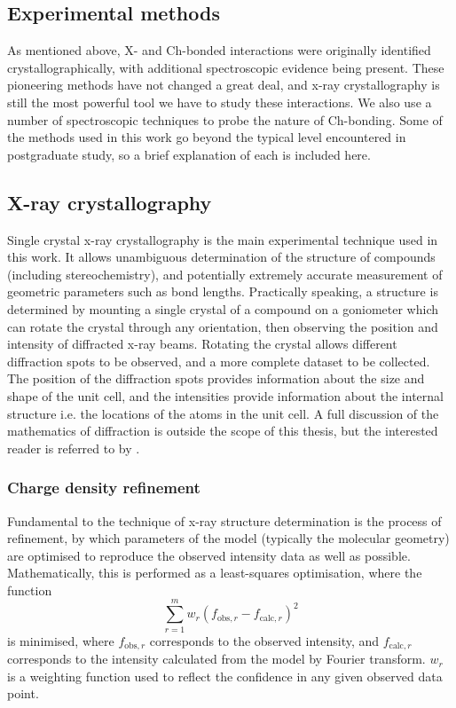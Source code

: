 \begin{refsection}
\section{Experimental methods}
As mentioned above, X- and Ch-bonded interactions were originally identified crystallographically, with additional spectroscopic evidence being present.
These pioneering methods have not changed a great deal, and x-ray crystallography is still the most powerful tool we have to study these interactions.
We also use a number of spectroscopic techniques to probe the nature of Ch-bonding.
Some of the methods used in this work go beyond the typical level encountered in postgraduate study, so a brief explanation of each is included here.

\subsection{X-ray crystallography}
Single crystal x-ray crystallography is the main experimental technique used in this work.
It allows unambiguous determination of the structure of compounds (including stereochemistry), and potentially extremely accurate measurement of geometric parameters such as bond lengths.
Practically speaking, a structure is determined by mounting a single crystal of a compound on a goniometer which can rotate the crystal through any orientation, then observing the position and intensity of diffracted x-ray beams.
Rotating the crystal allows different diffraction spots to be observed, and a more complete dataset to be collected.
The position of the diffraction spots provides information about the size and shape of the unit cell, and the intensities provide information about the internal structure i.e. the locations of the atoms in the unit cell.
A full discussion of the mathematics of diffraction is outside the scope of this thesis, but the interested reader is referred to  by \citeauthor{Stout1989}.\autocite{Stout1989}

\subsubsection{Charge density refinement}
Fundamental to the technique of x-ray structure determination is the process of refinement, by which parameters of the model (typically the molecular geometry) are optimised to reproduce the observed intensity data as well as possible.
Mathematically, this is performed as a least-squares optimisation, where the function
\begin{equation}
    \sum^{m}_{r=1} w_{r} \left(f_{\mathrm{obs}, r} - f_{\mathrm{calc}, r} \right) ^{2}
\end{equation}
is minimised, where $f_{\mathrm{obs}, r}$ corresponds to the observed intensity, and $f_{\mathrm{calc}, r}$ corresponds to the intensity calculated from the model by Fourier transform.
$w_{r}$ is a weighting function used to reflect the confidence in any given observed data point.


\end{refsection}
